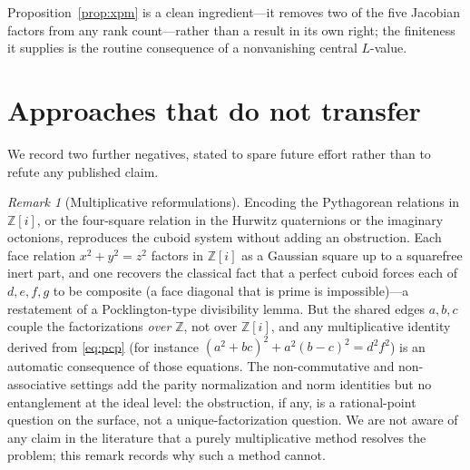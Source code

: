 \documentclass[11pt,reqno]{amsart}
\theoremstyle{plain}
\theoremstyle{definition}
\theoremstyle{remark}
\newtheorem{remark}[theorem]{Remark}
\newcommand{\Z}{\mathbb{Z}}
\begin{document}
Proposition~\ref{prop:xpm} is a clean ingredient---it removes two of the five
Jacobian factors from any rank count---rather than a result in its own right; the
finiteness it supplies is the routine consequence of a nonvanishing central $L$-value.

\section{Approaches that do not transfer}\label{sec:remarks}

We record two further negatives, stated to spare future effort rather than to
refute any published claim.

\begin{remark}[Multiplicative reformulations]\label{rem:mult}
Encoding the Pythagorean relations in $\Z[i]$, or the four-square relation in the
Hurwitz quaternions or the imaginary octonions, reproduces the cuboid system without
adding an obstruction. Each face relation $x^2+y^2=z^2$ factors in $\Z[i]$ as a
Gaussian square up to a squarefree inert part, and one recovers the classical fact
that a perfect cuboid forces each of $d,e,f,g$ to be composite (a face diagonal that
is prime is impossible)---a restatement of a Pocklington-type divisibility lemma. But
the shared edges $a,b,c$ couple the factorizations \emph{over} $\Z$, not over $\Z[i]$,
and any multiplicative identity derived from \eqref{eq:pcp} (for instance
$(a^2+bc)^2+a^2(b-c)^2=d^2f^2$) is an automatic consequence of those equations. The
non-commutative and non-associative settings add the parity normalization and norm
identities but no entanglement at the ideal level: the obstruction, if any, is a
rational-point question on the surface, not a unique-factorization question. We are
not aware of any claim in the literature that a purely multiplicative method resolves
the problem; this remark records why such a method cannot.
\end{remark}
\end{document}
